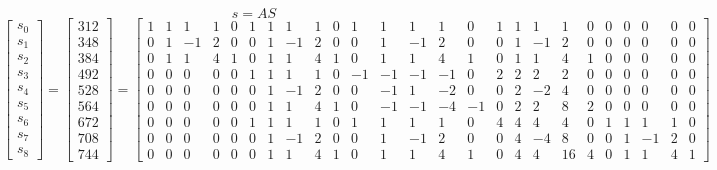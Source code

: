\documentclass{article}%
\begin{document}
\[%
s = AS%
\]%
\[%
\left[\begin{matrix}s_{0}\\s_{1}\\s_{2}\\s_{3}\\s_{4}\\s_{5}\\s_{6}\\s_{7}\\s_{8}\end{matrix}\right] = \left[\begin{matrix}312\\348\\384\\492\\528\\564\\672\\708\\744\end{matrix}\right] = \left[\begin{array}{ccccccccccccccccccccccccc}1 & 1 & 1 & 1 & 0 & 1 & 1 & 1 & 1 & 0 & 1 & 1 & 1 & 1 & 0 & 1 & 1 & 1 & 1 & 0 & 0 & 0 & 0 & 0 & 0\\0 & 1 & -1 & 2 & 0 & 0 & 1 & -1 & 2 & 0 & 0 & 1 & -1 & 2 & 0 & 0 & 1 & -1 & 2 & 0 & 0 & 0 & 0 & 0 & 0\\0 & 1 & 1 & 4 & 1 & 0 & 1 & 1 & 4 & 1 & 0 & 1 & 1 & 4 & 1 & 0 & 1 & 1 & 4 & 1 & 0 & 0 & 0 & 0 & 0\\0 & 0 & 0 & 0 & 0 & 1 & 1 & 1 & 1 & 0 & -1 & -1 & -1 & -1 & 0 & 2 & 2 & 2 & 2 & 0 & 0 & 0 & 0 & 0 & 0\\0 & 0 & 0 & 0 & 0 & 0 & 1 & -1 & 2 & 0 & 0 & -1 & 1 & -2 & 0 & 0 & 2 & -2 & 4 & 0 & 0 & 0 & 0 & 0 & 0\\0 & 0 & 0 & 0 & 0 & 0 & 1 & 1 & 4 & 1 & 0 & -1 & -1 & -4 & -1 & 0 & 2 & 2 & 8 & 2 & 0 & 0 & 0 & 0 & 0\\0 & 0 & 0 & 0 & 0 & 1 & 1 & 1 & 1 & 0 & 1 & 1 & 1 & 1 & 0 & 4 & 4 & 4 & 4 & 0 & 1 & 1 & 1 & 1 & 0\\0 & 0 & 0 & 0 & 0 & 0 & 1 & -1 & 2 & 0 & 0 & 1 & -1 & 2 & 0 & 0 & 4 & -4 & 8 & 0 & 0 & 1 & -1 & 2 & 0\\0 & 0 & 0 & 0 & 0 & 0 & 1 & 1 & 4 & 1 & 0 & 1 & 1 & 4 & 1 & 0 & 4 & 4 & 16 & 4 & 0 & 1 & 1 & 4 & 1\end{array}\right] \]
\end{document}
